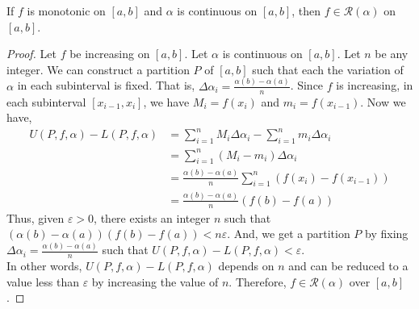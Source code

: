 \begin{theorem}
	If $f$ is monotonic on $[a,b]$ and $\alpha$ is continuous on $[a,b]$, then $f \in \mathscr{R}(\alpha)$ on $[a,b]$.
\end{theorem}
\begin{proof}
	Let $f$ be increasing on $[a,b]$.
	Let $\alpha$ is continuous on $[a,b]$.
	Let $n$ be any integer.
	We can construct a partition $P$ of $[a,b]$ such that each the variation of $\alpha$ in each subinterval is fixed.
	That is, $\Delta \alpha_i = \frac{\alpha(b)-\alpha(a)}{n}$.
	Since $f$ is increasing, in each subinterval $[x_{i-1},x_i]$, we have $M_i = f(x_i)$ and $m_i = f(x_{i-1})$.
	Now we have,
	\begin{align*}
		U(P,f,\alpha) - L(P,f,\alpha) & = \sum_{i=1}^n M_i \Delta \alpha_i - \sum_{i=1}^n m_i \Delta \alpha_i \\
		& = \sum_{i=1}^n (M_i-m_i) \Delta \alpha_i \\
		& = \frac{\alpha(b)-\alpha(a)}{n} \sum_{i=1}^n (f(x_i) - f(x_{i-1})) \\
		& = \frac{\alpha(b)-\alpha(a)}{n} (f(b)-f(a))
	\end{align*}
	Thus, given $\varepsilon > 0$, there exists an integer $n$ such that $ (\alpha(b)-\alpha(a))(f(b)-f(a)) < n\varepsilon $.
	And, we get a partition $P$ by fixing $\Delta \alpha_i = \frac{\alpha(b)-\alpha(a)}{n}$ such that $ U(P,f,\alpha)-L(P,f,\alpha) < \varepsilon $.\\

	In other words, $U(P,f,\alpha)-L(P,f,\alpha)$ depends on $n$ and can be reduced to a value less than $\varepsilon$ by increasing the value of $n$.
	Therefore, $f \in \mathscr{R}(\alpha)$ over $[a,b]$.
\end{proof}

